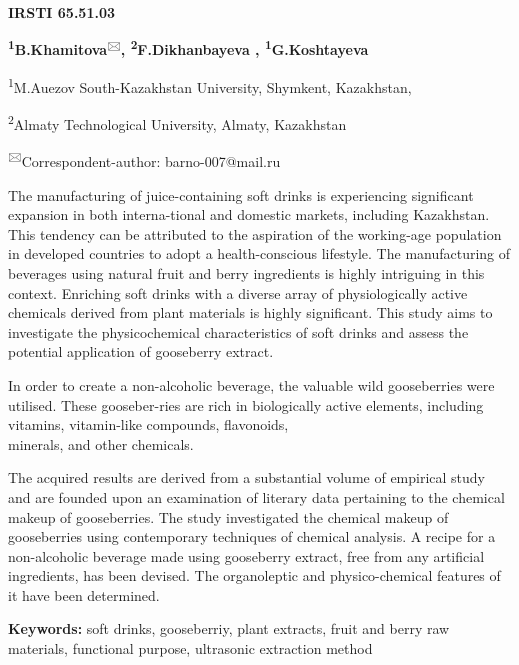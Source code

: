 \newpage
{\bfseries IRSTI 65.51.03}

\begin{center}

{\bfseries \textsuperscript{1}B.Khamitova}\textsuperscript{🖂}{\bfseries ,
\textsuperscript{2}F.Dikhanbayeva , \textsuperscript{1}G.Koshtayeva}

\textsuperscript{1}M.Auezov South-Kazakhstan University, Shymkent,
Kazakhstan,

\textsuperscript{2}Almaty Technological University, Almaty, Kazakhstan
\end{center}

\textsuperscript{🖂}Correspondent-author: barno-007@mail.ru

The manufacturing of juice-containing soft drinks is experiencing
significant expansion in both interna-tional and domestic markets,
including Kazakhstan. This tendency can be attributed to the aspiration
of the working-age population in developed countries to adopt a
health-conscious lifestyle. The manufacturing of beverages using natural
fruit and berry ingredients is highly intriguing in this context.
Enriching soft drinks with a diverse array of physiologically active
chemicals derived from plant materials is highly significant. This study
aims to investigate the physicochemical characteristics of soft drinks
and assess the potential application of gooseberry extract.~

In order to create a non-alcoholic beverage, the valuable wild
gooseberries were utilised. These gooseber-ries are rich in biologically
active elements, including vitamins, vitamin-like compounds, flavonoids,
\\minerals, and other chemicals.~

The acquired results are derived from a substantial volume of empirical
study and are founded upon an examination of literary data pertaining to
the chemical makeup of gooseberries. The study investigated the chemical
makeup of gooseberries using contemporary techniques of chemical
analysis. A recipe for a non-alcoholic beverage made using gooseberry
extract, free from any artificial ingredients, has been devised. The
organoleptic and physico-chemical features of it have been determined.~

{\bfseries Keywords:} soft drinks, gooseberriy, plant extracts, fruit and
berry raw materials, functional purpose, ultrasonic extraction method

